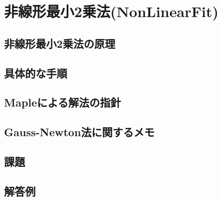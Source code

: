 \documentclass[10pt,a4j]{jreport}
\begin{document}
\chapter{非線形最小2乗法(NonLinearFit)}
\section{非線形最小2乗法の原理}

\section{具体的な手順}

\section{Mapleによる解法の指針}

\section{Gauss-Newton法に関するメモ}

\section{課題}

\section{解答例}

\end{document}
